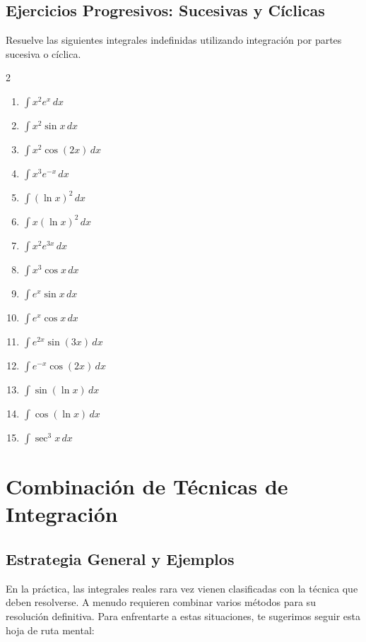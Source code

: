 \documentclass[12pt, letterpaper]{article}
\newcommand{\dx}{\,dx}
\begin{document}
\newpage

\subsection{Ejercicios Progresivos: Sucesivas y Cíclicas}
Resuelve las siguientes integrales indefinidas utilizando integración por partes sucesiva o cíclica.

\begin{multicols}{2}
\begin{enumerate}[leftmargin=*, resume]
  \item \facil{} $\int x^2 e^x \dx$
  \item \facil{} $\int x^2 \sin x \dx$
  \item \facil{} $\int x^2 \cos(2x) \dx$
  \item \medio{} $\int x^3 e^{-x} \dx$
  \item \medio{} $\int (\ln x)^2 \dx$
  \item \medio{} $\int x(\ln x)^2 \dx$
  \item \medio{} $\int x^2 e^{3x} \dx$
  \item \medio{} $\int x^3 \cos x \dx$
  \item \medio{} $\int e^x \sin x \dx$
  \item \medio{} $\int e^x \cos x \dx$
  \item \dificil{} $\int e^{2x} \sin(3x) \dx$
  \item \dificil{} $\int e^{-x} \cos(2x) \dx$
  \item \dificil{} $\int \sin(\ln x) \dx$
  \item \dificil{} $\int \cos(\ln x) \dx$
  \item \dificil{} $\int \sec^3 x \dx$
\end{enumerate}
\end{multicols}

\vspace{10pt}

\section{Combinación de Técnicas de Integración}

\subsection{Estrategia General y Ejemplos}
En la práctica, las integrales reales rara vez vienen clasificadas con la técnica que deben resolverse. A menudo requieren combinar varios métodos para su resolución definitiva.
Para enfrentarte a estas situaciones, te sugerimos seguir esta hoja de ruta mental:
\end{document}
